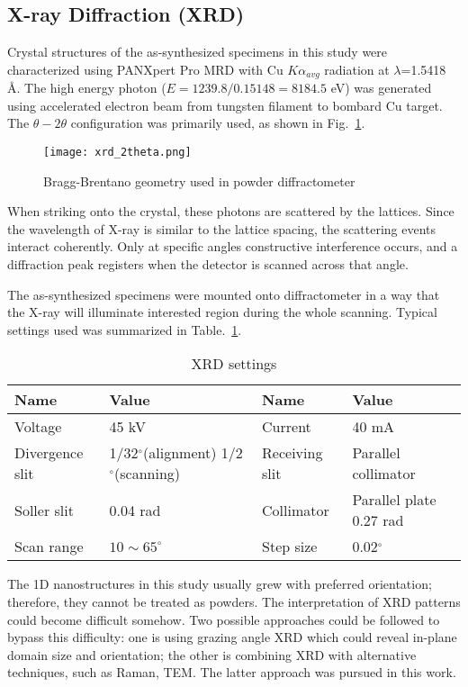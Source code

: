 \subsection{X-ray Diffraction (XRD)}
Crystal structures of the as-synthesized specimens in this study were characterized using PANXpert Pro MRD with Cu $K\alpha_{avg}$ radiation at $\lambda$=1.5418 \AA. The high energy photon ($E = 1239.8/0.15148= 8184.5$ eV) was generated using accelerated electron beam from tungsten filament to bombard Cu target. The $\theta-2\theta$ configuration was primarily used, as shown in Fig.~\ref{fig:ch2theta}. 
\begin{figure}[htb]
\centering
\texttt{[image: xrd\_2theta.png]}
\caption[XRD configuration]{Bragg-Brentano geometry used in powder diffractometer}
\label{fig:ch2theta}
\end{figure}
When striking onto the crystal, these photons are scattered by the lattices. Since the wavelength of X-ray is similar to the lattice spacing, the scattering events interact coherently. Only at specific angles constructive interference occurs, and a diffraction peak registers when the detector is scanned across that angle.  

The as-synthesized specimens were mounted onto diffractometer in a way that the X-ray will illuminate interested region during the whole scanning. Typical settings used was summarized in Table.~\ref{tab:ch2xrd}.

\begin{table}[htb]
\centering
\caption{XRD settings}\label{tab:ch2xrd}
\begin{tabular}{lp{1.5in}lp{1.5in}}
\toprule
Name & Value & Name & Value  \\
\midrule
Voltage   & 45 kV & Current & 40 mA \\
Divergence slit & 1/32$^\circ$(alignment) 1/2$^\circ$(scanning) & Receiving slit& Parallel collimator \\
Soller slit & 0.04 rad & Collimator & Parallel plate 0.27 rad \\
Scan range & $10 \sim 65 ^\circ$ & Step size & 0.02$^\circ$ \\
\bottomrule
\end{tabular}
\end{table}

The 1D nanostructures in this study usually grew with preferred orientation; therefore, they cannot be treated as powders. The interpretation of XRD patterns could become difficult somehow. Two possible approaches could be followed to bypass this difficulty: one is using grazing angle XRD which could reveal in-plane domain size and orientation;\cite{Tersigni2011,Goorsky2002} the other is combining XRD with alternative techniques, such as Raman, TEM. The latter approach was pursued in this work. 


